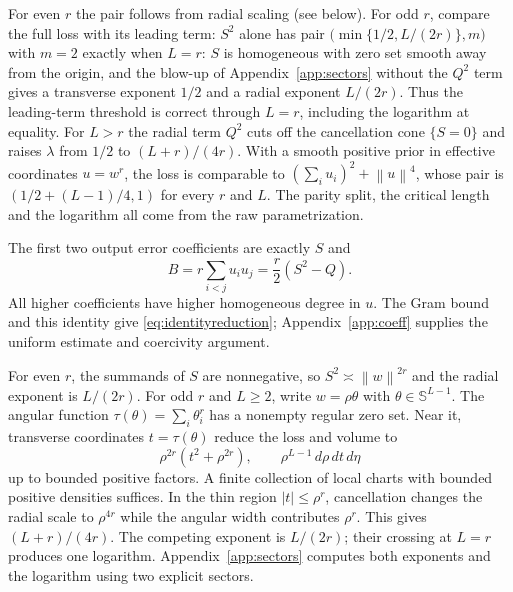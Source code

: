 \documentclass[11pt,letterpaper]{amsart}
\makeatletter
\theoremstyle{scplain}
\newcommand{\asym}{\asymp}
\newcommand{\norm}[1]{\left\lVert#1\right\rVert}
\renewcommand\paragraph{\@startsection{paragraph}{4}{\z@}{.6\baselineskip\@plus.2\baselineskip}{-.6em}{\normalfont\scshape}}
\makeatother
\begin{document}
\paragraph{What is classical.}
For even $r$ the pair follows from radial scaling (see below). For odd $r$, compare the full loss with its leading term: $S^2$ alone has pair $\bigl(\min\{1/2,L/(2r)\},m\bigr)$ with $m=2$ exactly when $L=r$: $S$ is homogeneous with zero set smooth away from the origin, and the blow-up of Appendix~\ref{app:sectors} without the $Q^2$ term gives a transverse exponent $1/2$ and a radial exponent $L/(2r)$. Thus the leading-term threshold is correct through $L=r$, including the logarithm at equality. For $L>r$ the radial term $Q^2$ cuts off the cancellation cone $\{S=0\}$ and raises $\lambda$ from $1/2$ to $(L+r)/(4r)$. With a smooth positive prior in effective coordinates $u=w^r$, the loss is comparable to $(\sum_iu_i)^2+\norm{u}^4$, whose pair is $(1/2+(L-1)/4,1)$ for every $r$ and $L$. The parity split, the critical length and the logarithm all come from the raw parametrization.

The first two output error coefficients are exactly $S$ and
\[
 B=r\sum_{i<j}u_i u_j=\frac r2(S^2-Q).
\]
All higher coefficients have higher homogeneous degree in $u$. The Gram bound and this identity give \eqref{eq:identityreduction}; Appendix~\ref{app:coeff} supplies the uniform estimate and coercivity argument.

For even $r$, the summands of $S$ are nonnegative, so $S^2\asym\norm{w}^{2r}$ and the radial exponent is $L/(2r)$. For odd $r$ and $L\ge2$, write $w=\rho\theta$ with $\theta\in\mathbb S^{L-1}$. The angular function $\tau(\theta)=\sum_i\theta_i^r$ has a nonempty regular zero set. Near it, transverse coordinates $t=\tau(\theta)$ reduce the loss and volume to
\begin{equation}\label{eq:angularmodel}
 \rho^{2r}(t^2+\rho^{2r}),\qquad
 \rho^{L-1}\,d\rho\,dt\,d\eta
\end{equation}
up to bounded positive factors. A finite collection of local charts with bounded positive densities suffices. In the thin region $|t|\le\rho^r$, cancellation changes the radial scale to $\rho^{4r}$ while the angular width contributes $\rho^r$. This gives \mbox{$(L+r)/(4r)$}. The competing exponent is $L/(2r)$; their crossing at $L=r$ produces one logarithm. Appendix~\ref{app:sectors} computes both exponents and the logarithm using two explicit sectors.
\end{document}
